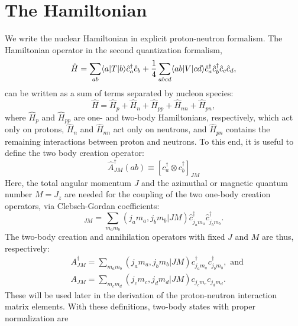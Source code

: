 \section{The Hamiltonian}
We write the nuclear Hamiltonian in explicit proton-neutron formalism. The 
Hamiltonian operator in the second quantization formalism,
\begin{equation}
	\hat{H}=\sum_{ab}\langle a|T|b\rangle\hat{c}^\dagger_a\hat{c}_b
    +\frac{1}{4}\sum_{abcd}\langle ab|V|cd\rangle\hat{c}^\dagger_a\hat{c}^\dagger_b\hat{c}_c\hat{c}_d,
\end{equation}
can be written as a sum of terms separated by nucleon species\cite{Johnson13}:
\begin{equation}\label{sep}
    \hat{H} = \hat{H}_p + \hat{H}_n + \hat{H}_{pp} + \hat{H}_{nn} + \hat{H}_{pn},
\end{equation}
where $\hat{H}_p$ and $\hat{H}_{pp}$ are one- and two-body Hamiltonians, respectively, which act
only on protons, $\hat{H}_n$ and $\hat{H}_{nn}$ act only on neutrons, and $\hat{H}_{pn}$
contains the remaining interactions between proton and neutrons. 
To this end, it is useful to define the two body creation operator\cite{Schuck}:
\begin{equation}
    \hat{A}_{JM}^\dagger(ab)\equiv [c_a^\dagger \otimes c_b ^\dagger]_{JM}
\end{equation}
Here, the total angular momentum $J$ and the azimuthal or magnetic quantum number 
$M=J_z$ are needed for the coupling of the two one-body creation operators, 
via Clebsch-Gordan coefficients\cite{Edmonds}:
\begin{equation}
    [c_a^\dagger \otimes c_b ^\dagger]_{JM} = 
        \sum_{m_am_b} (j_am_a, j_bm_b|JM)\hat{c}^\dagger_{j_am_a}
        \hat{c}^\dagger_{j_bm_b}.
\end{equation}
The two-body creation and annihilation operators\cite{Feshbach} with fixed $J$ and $M$ are thus, respectively:
\begin{equation}\begin{split}\label{pairs}
    & A^\dagger_{JM} = \sum_{m_am_b} (j_a m_a, j_b m_b | JM ) c^\dagger_{j_am_a} 
c^\dagger_{j_bm_b}, \textrm{ and} \\
    & A_{JM} = \sum_{m_cm_d} (j_c m_c, j_d m_d | JM ) c_{j_cm_c} c_{j_dm_d}.
\end{split}\end{equation}
These will be used later in the derivation of the proton-neutron interaction
matrix elements.
With these definitions, two-body states with proper normalization are\cite{Brussard}
